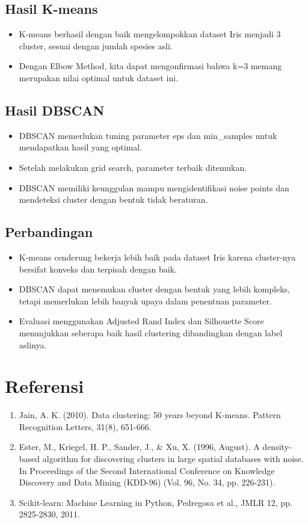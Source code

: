 \documentclass[a4paper,12pt]{article}
\begin{document}
\subsection{Hasil K-means}
\begin{itemize}
  \item K-means berhasil dengan baik mengelompokkan dataset Iris menjadi 3 cluster, sesuai dengan jumlah spesies asli.
  \item Dengan Elbow Method, kita dapat mengonfirmasi bahwa k=3 memang merupakan nilai optimal untuk dataset ini.
\end{itemize}

\subsection{Hasil DBSCAN}
\begin{itemize}
  \item DBSCAN memerlukan tuning parameter eps dan min\_samples untuk mendapatkan hasil yang optimal.
  \item Setelah melakukan grid search, parameter terbaik ditemukan.
  \item DBSCAN memiliki keunggulan mampu mengidentifikasi noise points dan mendeteksi cluster dengan bentuk tidak beraturan.
\end{itemize}

\subsection{Perbandingan}
\begin{itemize}
  \item K-means cenderung bekerja lebih baik pada dataset Iris karena cluster-nya bersifat konveks dan terpisah dengan baik.
  \item DBSCAN dapat menemukan cluster dengan bentuk yang lebih kompleks, tetapi memerlukan lebih banyak upaya dalam penentuan parameter.
  \item Evaluasi menggunakan Adjusted Rand Index dan Silhouette Score menunjukkan seberapa baik hasil clustering dibandingkan dengan label aslinya.
\end{itemize}

\section{Referensi}
\begin{enumerate}
  \item Jain, A. K. (2010). Data clustering: 50 years beyond K-means. Pattern Recognition Letters, 31(8), 651-666.
  \item Ester, M., Kriegel, H. P., Sander, J., \& Xu, X. (1996, August). A density-based algorithm for discovering clusters in large spatial databases with noise. In Proceedings of the Second International Conference on Knowledge Discovery and Data Mining (KDD-96) (Vol. 96, No. 34, pp. 226-231).
  \item Scikit-learn: Machine Learning in Python, Pedregosa et al., JMLR 12, pp. 2825-2830, 2011.
\end{enumerate}
\end{document}
